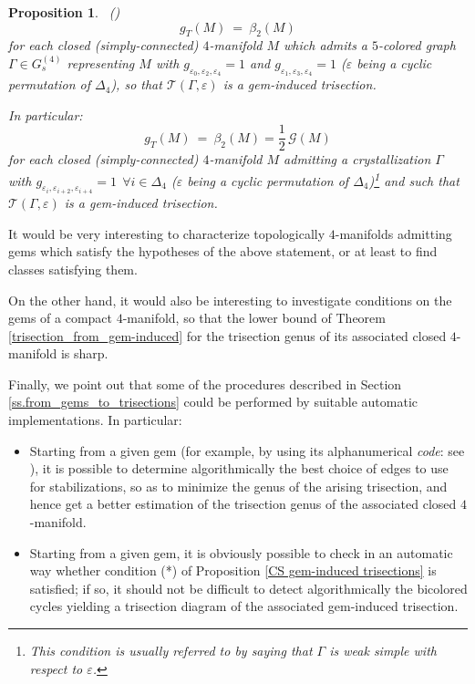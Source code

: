 \documentclass[12pt,a4paper]{article}
\newtheorem{proposition}[lemma]{Proposition}
\newcommand{\G}{\Gamma}
\begin{document}
\begin{proposition} \label{minimality closed weak simple}  \  {\rm (\cite{Casali-Cristofori gem-induced})} \
$$g_T(M)\ =\ \beta_2(M)$$
for each closed  (simply-connected) $4$-manifold $M$  which admits a $5$-colored graph $\G\in G_s^{(4)}$ representing $M$ with  
$g_{\varepsilon_0,\varepsilon_{2},\varepsilon_{4}} = 1 $ and 
$g_{\varepsilon_1,\varepsilon_{3},\varepsilon_{4}} = 1 $ 
($\varepsilon$ being a cyclic permutation of $\Delta_4$), so that $\mathcal T(\G,\varepsilon)$ is a gem-induced trisection. 
\par \noindent 
In particular: 
$$g_T(M)\ =\ \beta_2(M) =\frac 1 2 
 \, \mathcal G(M)$$      
for each closed  (simply-connected) $4$-manifold $M$ admitting a  crystallization $\G$ with $g_{\varepsilon_i,\varepsilon_{i+2},\varepsilon_{i+4}} = 1 \ \ \forall i \in \Delta_4$ ($\varepsilon$ being a cyclic permutation of $\Delta_4$)\footnote{This condition is usually referred to by saying that  $\G$ is {\it weak simple} with respect to $\varepsilon$.} and such that $\mathcal T(\G,\varepsilon)$ is a gem-induced trisection.
\end{proposition}

It would be very interesting to characterize topologically $4$-manifolds admitting gems which satisfy the hypotheses of the above statement, or at least to find classes satisfying them.

On the other hand, it would also be interesting to investigate conditions on the gems of a compact $4$-manifold, so that the lower bound of Theorem \ref{trisection_from_gem-induced} for the trisection genus  of its associated closed $4$-manifold is sharp. 

\bigskip

Finally, we point out that some of the procedures described in Section \ref{ss.from_gems_to_trisections} could be performed by suitable automatic implementations. 
In particular: 
\begin{itemize}
    \item Starting from a given gem (for example, by using its alphanumerical {\it code}: see \cite{Casali-Gagliardi code}), it is possible to determine algorithmically  
    the best choice of edges to use for stabilizations, so as to minimize the genus of the arising trisection, and hence get a better estimation of the trisection genus of the associated closed $4$-manifold.  
    \item Starting from a given gem, it is obviously possible to check in an automatic way whether condition (*) of Proposition \ref{CS gem-induced trisections} is satisfied; if so, it should not be difficult to detect algorithmically     the bicolored cycles yielding a trisection diagram of the associated gem-induced trisection.
    \end{itemize}
\end{document}

